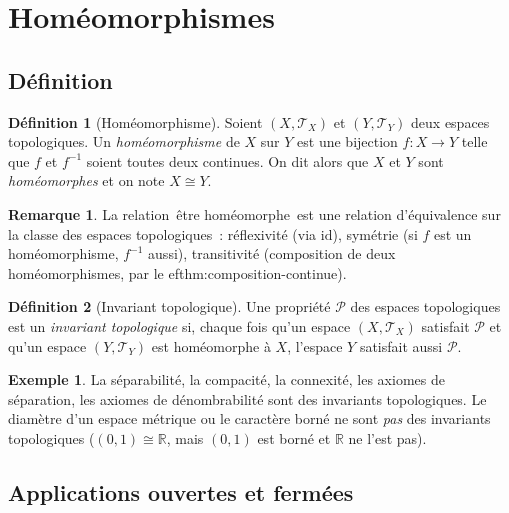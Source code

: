 \documentclass[12pt,a4paper,openany]{book}
\theoremstyle{definition}
\newtheorem{definition}{Définition}[chapter]
\theoremstyle{cours}
\theoremstyle{coursnormal}
\newtheorem{remarque}[theoreme]{Remarque}
\newtheorem{exemple}[theoreme]{Exemple}
\newcommand{\R}{\mathbb{R}}
\newcommand{\T}{\mathcal{T}}
\providecommand{\og}{\guillemotleft\,}
\providecommand{\fg}{\,\guillemotright}
\begin{document}
\section{Homéomorphismes}\label{sec:homeomorphismes}

\subsection{Définition}\label{subsec:homeo-def}

\begin{definition}[Homéomorphisme]\label{def:homeomorphisme}
  Soient $(X,\T_X)$ et $(Y,\T_Y)$ deux espaces topologiques. Un
  \emph{homéomorphisme} de $X$ sur $Y$ est une
  bijection $f\colon X\to Y$ telle que $f$ et $f^{-1}$ soient toutes deux
  continues. On dit alors que $X$ et $Y$ sont \emph{homéomorphes} et on
  note $X\cong Y$.
\end{definition}

\begin{remarque}
  La relation \og{}être homéomorphe\fg{} est une relation d'équivalence sur la
  classe des espaces topologiques~: réflexivité (via $\mathrm{id}$), symétrie
  (si $f$ est un homéomorphisme, $f^{-1}$ aussi), transitivité (composition de
  deux homéomorphismes, par le 
ef{thm:composition-continue}).
\end{remarque}

\begin{definition}[Invariant topologique]\label{def:invariant-topologique}
  Une propriété $\mathcal{P}$ des espaces topologiques est un \emph{invariant
  topologique} si, chaque fois qu'un espace
  $(X,\T_X)$ satisfait $\mathcal{P}$ et qu'un espace $(Y,\T_Y)$ est
  homéomorphe à $X$, l'espace $Y$ satisfait aussi $\mathcal{P}$.
\end{definition}

\begin{exemple}
  La séparabilité, la compacité, la connexité, les axiomes de séparation, les
  axiomes de dénombrabilité sont des invariants topologiques. Le diamètre
  d'un espace métrique ou le caractère borné ne sont \emph{pas} des invariants
  topologiques ($(0,1)\cong\R$, mais $(0,1)$ est borné et $\R$ ne l'est pas).
\end{exemple}

\subsection{Applications ouvertes et fermées}\label{subsec:ouvertes-fermees}
\end{document}
